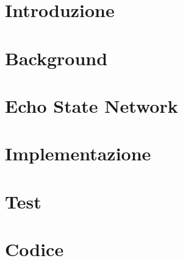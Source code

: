 \documentclass[12pt,titlepage]{report}
\begin{document}
\tableofcontents
\listoffigures
\listoftables

\chapter{Introduzione} \label{introduzione}


\chapter{Background} \label{cap:background}


\chapter{Echo State Network}\label{cap:modello}


\chapter{Implementazione}\label{cap:implementazione}


\chapter{Test}\label{cap:test}


\begin{thebibliography}{99}
	
\end{thebibliography}

\appendix
\chapter{Codice}









\end{document}
